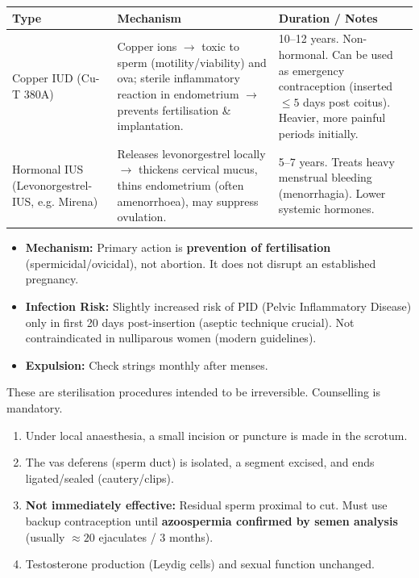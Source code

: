 \documentclass[11pt]{article}
\newcommand{\cle}[1]{{\popxbold\color{popdark}#1}}
\newcounter{popsec}
\newcounter{popsub}
\newcommand{\courssub}[1]{%
  \stepcounter{popsub}%
  \par\vspace{9pt}\noindent{\popxbold\fontsize{11.5}{13}\selectfont\color{popink}{\color{poporange}\thepopsec.\thepopsub}\hspace{6pt}#1}\par\nopagebreak\vspace{4pt}
}
\begin{document}
\begin{center}
\begin{tabularx}{\linewidth}{|l|X|X|}
\hline
\rowcolor{popblueL}
\textbf{Type} & \textbf{Mechanism} & \textbf{Duration / Notes} \\
\hline
Copper IUD (Cu-T 380A) & Copper ions $\to$ toxic to sperm (motility/viability) and ova; sterile inflammatory reaction in endometrium $\to$ prevents fertilisation \& implantation. & 10--12 years. Non-hormonal. Can be used as emergency contraception (inserted $\le 5$ days post coitus). Heavier, more painful periods initially. \\
\hline
Hormonal IUS (Levonorgestrel-IUS, e.g. Mirena) & Releases levonorgestrel locally $\to$ thickens cervical mucus, thins endometrium (often amenorrhoea), may suppress ovulation. & 5--7 years. Treats heavy menstrual bleeding (menorrhagia). Lower systemic hormones. \\
\hline
\end{tabularx}
\end{center}

\begin{attention}
\begin{itemize}
    \item \textbf{Mechanism:} Primary action is \textbf{prevention of fertilisation} (spermicidal/ovicidal), not abortion. It does not disrupt an established pregnancy.
    \item \textbf{Infection Risk:} Slightly increased risk of PID (Pelvic Inflammatory Disease) only in first 20 days post-insertion (aseptic technique crucial). Not contraindicated in nulliparous women (modern guidelines).
    \item \textbf{Expulsion:} Check strings monthly after menses.
\end{itemize}
\end{attention}

\courssub{Surgical (Permanent) Methods}

These are \cle{sterilisation} procedures intended to be irreversible. Counselling is mandatory.

\begin{methode}
\begin{enumerate}
    \item Under local anaesthesia, a small incision or puncture is made in the scrotum.
    \item The \cle{vas deferens} (sperm duct) is isolated, a segment excised, and ends ligated/sealed (cautery/clips).
    \item \textbf{Not immediately effective:} Residual sperm proximal to cut. Must use backup contraception until \textbf{azoospermia confirmed by semen analysis} (usually $\approx 20$ ejaculates / 3 months).
    \item Testosterone production (Leydig cells) and sexual function unchanged.
\end{enumerate}
\end{methode}
\end{document}
